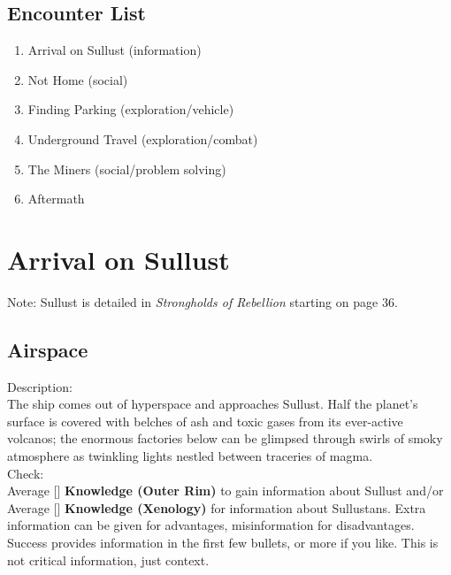 \documentclass{book}
\newcommand{\df}{\difficulty}
\begin{document}
\begin{multicols*}{2}
\subsection{Encounter List}
\begin{enumerate}
    \item Arrival on Sullust (information)
    \item Not Home (social)
    \item Finding Parking (exploration/vehicle)
    \item Underground Travel (exploration/combat)
    \item The Miners (social/problem solving)
    \item Aftermath
\end{enumerate}

\section{Arrival on Sullust}

    Note: Sullust is detailed in \emph{Strongholds of Rebellion} starting on page 36.

\subsection{Airspace}

Description:\\
The ship comes out of hyperspace and approaches Sullust. Half the planet’s surface is covered with belches of ash and toxic gases from its ever-active volcanos; the enormous factories below can be glimpsed through swirls of smoky atmosphere as twinkling lights nestled between traceries of magma.\\
Check:\\
Average [\df\df] \textbf{Knowledge (Outer Rim)} to gain information about Sullust and/or Average [\df\df] \textbf{Knowledge (Xenology)} for information about Sullustans. Extra information can be given for advantages, misinformation for disadvantages. Success provides information in the first few bullets, or more if you like.  This is not critical information, just context.\\


\end{multicols*}
\end{document}
